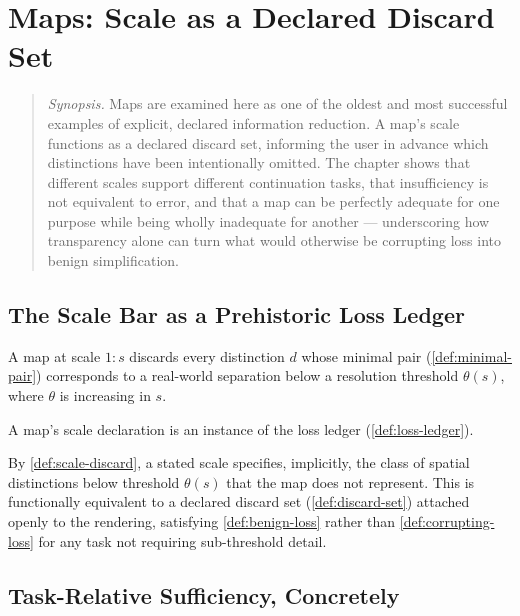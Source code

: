\chapter{Maps: Scale as a Declared Discard Set}
\label{ch:maps}

\begin{quotation}
\noindent\textit{Synopsis.} Maps are examined here as one of the oldest and
most successful examples of explicit, declared information reduction. A
map's scale functions as a declared discard set, informing the user in
advance which distinctions have been intentionally omitted. The chapter
shows that different scales support different continuation tasks, that
insufficiency is not equivalent to error, and that a map can be perfectly
adequate for one purpose while being wholly inadequate for another ---
underscoring how transparency alone can turn what would otherwise be
corrupting loss into benign simplification.
\end{quotation}

\section{The Scale Bar as a Prehistoric Loss Ledger}

\begin{definition}
\label{def:scale-discard}
A map at scale $1{:}s$ discards every distinction $d$ whose minimal pair
(\cref{def:minimal-pair}) corresponds to a real-world separation below a
resolution threshold $\theta(s)$, where $\theta$ is increasing in $s$.
\end{definition}

\begin{proposition}
\label{prop:scale-declared}
A map's scale declaration is an instance of the loss ledger
(\cref{def:loss-ledger}).
\end{proposition}

\begin{proofsketch}
By \cref{def:scale-discard}, a stated scale specifies, implicitly, the
class of spatial distinctions below threshold $\theta(s)$ that the map
does not represent. This is functionally equivalent to a declared
discard set (\cref{def:discard-set}) attached openly to the rendering,
satisfying \cref{def:benign-loss} rather than \cref{def:corrupting-loss}
for any task not requiring sub-threshold detail.
\end{proofsketch}

\section{Task-Relative Sufficiency, Concretely}

